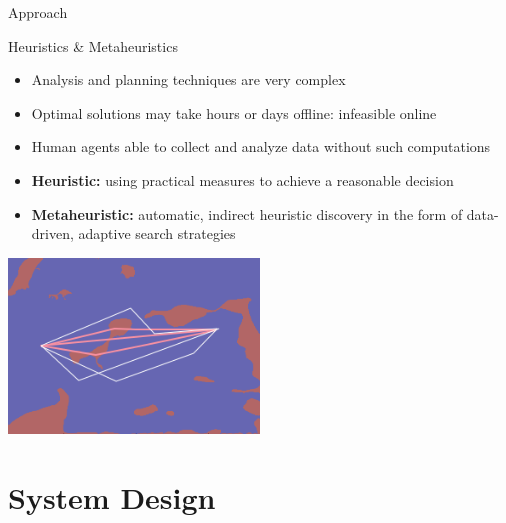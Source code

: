 \documentclass[9pt]{beamer}
\begin{document}
\begin{frame}{Approach}
    \begin{block}{Heuristics \& Metaheuristics}
        \begin{itemize}
	        \item Analysis and planning techniques are very complex
    	    \item Optimal solutions may take hours or days offline: infeasible online
            \item Human agents able to collect and analyze data without such computations
	        \item \textbf{Heuristic:} using practical measures to achieve a reasonable decision
	        \item \textbf{Metaheuristic:} automatic, indirect heuristic discovery in the form of data-driven, adaptive search strategies
        \end{itemize}
        \begin{center}
            \includegraphics[width=0.5\textwidth,trim={0cm 0cm 0cm 0cm},clip]{img/metaheuristics.png}
        \end{center}
    \end{block}
\end{frame}

\section{System Design}
\end{document}
